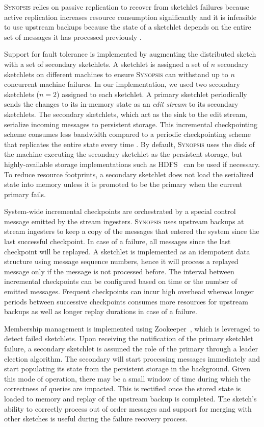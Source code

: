 \textsc{Synopsis} relies on passive replication to recover from sketchlet failures because active replication increases resource consumption significantly and it is infeasible to use upstream backups because the state of a sketchlet depends on the entire set of messages it has processed previously \cite{castro2013integrating}.

Support for fault tolerance is implemented by augmenting the distributed sketch with a set of secondary sketchlets.
A sketchlet is assigned a set of $n$ secondary sketchlets on different machines to ensure \textsc{Synopsis} can withstand up to $n$ concurrent machine failures.
In our implementation, we used two secondary sketchlets ($n=2$) assigned to each sketchlet.
A primary sketchlet periodically sends the changes to its in-memory state as an \emph{edit stream} to its secondary sketchlets.
The secondary sketchlets, which act as the sink to the edit stream, serialize incoming messages to persistent storage.
This incremental checkpointing scheme consumes less bandwidth compared to a periodic checkpointing scheme that replicates the entire state every time \cite{castro2013integrating}.
By default, \textsc{Synopsis} uses the disk of the machine executing the secondary sketchlet as the persistent storage, but highly-available storage implementations such as HDFS~\cite{borthakur2008hdfs} can be used if necessary.
To reduce resource footprints, a secondary sketchlet does not load the serialized state into memory unless it is promoted to be the primary when the current primary fails.

System-wide incremental checkpoints are orchestrated by a special control message emitted by the stream ingesters.
\textsc{Synopsis} uses upstream backups at stream ingesters to keep a copy of the messages that entered the system since the last successful checkpoint.
In case of a failure, all messages since the last checkpoint will be replayed.
A sketchlet is implemented as an idempotent data structure using message sequence numbers, hence it will process a replayed message only if the message is not processed before.
The interval between incremental checkpoints can be configured based on time or the number of emitted messages.
Frequent checkpoints can incur high overhead whereas longer periods between successive checkpoints consumes more resources for upstream backups as well as longer replay durations in case of a failure.

Membership management is implemented using Zookeeper~\cite{hunt2010zookeeper}, which is leveraged to detect failed sketchlets.
Upon receiving the notification of the primary sketchlet failure, a secondary sketchlet is assumed the role of the primary through a leader election algorithm.
The secondary will start processing messages immediately and start populating its state from the persistent storage in the background.
Given this mode of operation, there may be a small window of time during which the correctness of queries are impacted.
This is rectified once the stored state is loaded to memory and replay of the upstream backup is completed.
The sketch's ability to correctly process out of order messages and support for merging with other sketches is useful during the failure recovery process.

